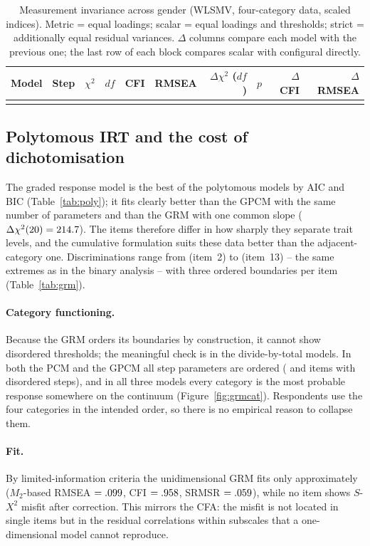 \documentclass[11pt,a4paper]{article}
\newcommand{\itemno}[1]{item~#1}
\begin{document}
\begin{table}[t]
\centering\footnotesize
\setlength{\tabcolsep}{4pt}
\caption{Measurement invariance across gender (WLSMV, four-category data, scaled
indices). Metric = equal loadings; scalar = equal loadings and thresholds; strict =
additionally equal residual variances. $\Delta$ columns compare each model with the
previous one; the last row of each block compares scalar with configural directly.}
\label{tab:mi}
\begin{tabular}{ll rr rr rl rr}
\toprule
Model & Step & $\chi^{2}$ & $df$ & CFI & RMSEA & $\Delta\chi^{2}$ ($df$) & $p$ & $\Delta$CFI & $\Delta$RMSEA\\
\midrule
\\
\bottomrule
\end{tabular}
\end{table}

\subsection{Polytomous IRT and the cost of dichotomisation}\label{sec:grm}

The graded response model is the best of the polytomous models by AIC and BIC
(Table~\ref{tab:poly}); it fits clearly better than the GPCM with the same number of
parameters and than the GRM with one common slope ($\Delta\chi^2(20)=214.7$). The
items therefore differ in how sharply they separate trait levels, and the cumulative
formulation suits these data better than the adjacent-category one. Discriminations
range from \GRMAMin{} (\itemno{2}) to \GRMAMax{} (\itemno{13}) -- the same extremes as in
the binary analysis -- with three ordered boundaries per item (Table~\ref{tab:grm}).

\paragraph{Category functioning.} Because the GRM orders its boundaries by construction,
it cannot show disordered thresholds; the meaningful check is in the divide-by-total
models. In both the PCM and the GPCM all step parameters are ordered
(\DisorderedPCM{} and \DisorderedGPCM{} items with disordered steps), and in all three
models every category is the most probable response somewhere on the continuum
(Figure~\ref{fig:grmcat}). Respondents use the four categories in the intended order, so
there is no empirical reason to collapse them.

\paragraph{Fit.} By limited-information criteria the unidimensional GRM fits only
approximately ($M_2$-based RMSEA $=.099$, CFI $=.958$,
SRMSR $=.059$), while no item shows $S$-$X^2$ misfit after correction. This
mirrors the CFA: the misfit is not located in single items but in the residual
correlations within subscales that a one-dimensional model cannot reproduce.
\end{document}
